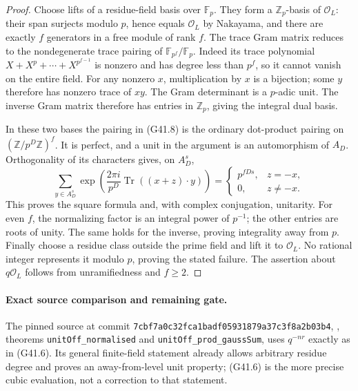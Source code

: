 \begin{proof}
Choose lifts of a residue-field basis over $\mathbb F_p$.
They form a $\mathbb Z_p$-basis of $\mathcal O_L$: their
span surjects modulo $p$, hence equals $\mathcal O_L$ by
Nakayama, and there are exactly $f$ generators in a free
module of rank $f$.  The trace Gram matrix reduces to the
nondegenerate trace pairing of $\mathbb F_{p^f}/\mathbb F_p$.
Indeed its trace polynomial
$X+X^p+\cdots+X^{p^{f-1}}$ is nonzero and has degree less
than $p^f$, so it cannot vanish on the entire field.  For
any nonzero $x$, multiplication by $x$ is a bijection;
some $y$ therefore has nonzero trace of $xy$.
The Gram determinant is a $p$-adic unit.
The inverse Gram matrix therefore has
entries in $\mathbb Z_p$, giving the integral dual basis.

In these two bases the pairing in (G41.8) is the ordinary
dot-product pairing on $(\mathbb Z/p^D\mathbb Z)^f$.
It is perfect, and a unit in the argument is an automorphism
of $A_D$.  Orthogonality of its characters gives, on $A_D^s$,
\[
 \sum_{y\in A_D^s}
       \exp\!\left(\frac{2\pi i}{p^D}
           \operatorname{Tr}((x+z)\cdot y)\right)
 =\begin{cases}p^{fDs},&z=-x,\\0,&z\ne-x.\end{cases}
\]
This proves the square formula and, with complex conjugation,
unitarity.  For even $f$, the normalizing factor is an integral
power of $p^{-1}$; the other entries are roots of unity.
The same holds for the inverse, proving integrality away from
$p$.  Finally choose a residue class outside the prime field
and lift it to $\mathcal O_L$.  No rational integer represents
it modulo $p$, proving the stated failure.  The assertion
about $q\mathcal O_L$ follows from unramifiedness and $f\geq2$.
\end{proof}

\paragraph{Exact source comparison and remaining gate.}
The pinned source at commit
\texttt{7cbf7a0c32fca1badf05931879a37c3f8a2b03b4},
,
theorems \texttt{unitOff\_normalised} and
\texttt{unitOff\_prod\_gaussSum}, uses $q^{-nr}$ exactly as
in (G41.6).  Its general finite-field statement already allows
arbitrary residue degree and proves an away-from-level unit
property; (G41.6) is the more precise cubic evaluation, not
a correction to that statement.


